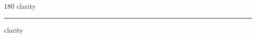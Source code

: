 
\begin{frame}
\begin{center}
\begin{turn}{180}
{\fontsize{2.5cm}{1em}\selectfont clarity}
\end{turn}
\vspace{1em}\par  
\hrule
\vspace{1em}\par  
{\fontsize{2.5cm}{1em}\selectfont clarity}
\end{center}
\end{frame}
